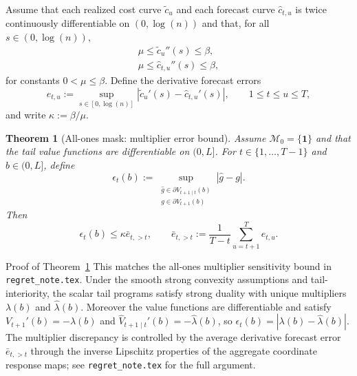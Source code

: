 \documentclass{uai2026} %
\newtheorem{theorem}{Theorem}[section]
\newcommand{\1}{\mathbf{1}}
\newcommand{\mcal}{\mathcal{M}}
\begin{document}
Assume that each realized cost curve $\tilde{c}_u$ and each forecast curve $\hat{c}_{t,u}$ is twice continuously differentiable on $(0,\log(n))$ and that, for all $s\in(0,\log(n))$,
\begin{equation*}
  \begin{aligned}
    \mu \le \tilde{c}_u''(s) \le \beta,\\
    \mu \le \hat{c}_{t,u}''(s) \le \beta,
  \end{aligned}
\end{equation*}
for constants $0<\mu\le \beta$.
Define the derivative forecast errors
\begin{equation}
  \label{eq:derivative-error}
  e_{t,u} := \sup_{s\in[0,\log(n)]}\left|\tilde{c}_u'(s) - \hat{c}_{t,u}'(s)\right|,
  \qquad 1 \le t \le u \le T,
\end{equation}
and write $\kappa:=\beta/\mu$.

\begin{theorem}[All-ones mask: multiplier error bound]
  \label{thm:epsilon-allones}
  Assume $\mcal_{0}=\{\1\}$ and that the tail value functions are differentiable on $(0,L]$.
  For $t\in\{1,\dots,T-1\}$ and $b\in(0,L]$, define
  \begin{equation*}
    \epsilon_t(b)
    :=
    \sup_{\substack{\hat{g}\in \partial \hat{V}_{t+1\mid t}(b)\\ g\in \partial V_{t+1}(b)}}
    |\hat{g}-g|.
  \end{equation*}
  Then
  \begin{equation*}
    \epsilon_t(b) \le \kappa \bar{e}_{t,>t},
    \qquad
    \bar{e}_{t,>t}:=\frac{1}{T-t}\sum_{u=t+1}^{T} e_{t,u}.
  \end{equation*}
\end{theorem}

\begin{appendixproof}{Proof of Theorem~\ref{thm:epsilon-allones}}
  This matches the all-ones multiplier sensitivity bound in \texttt{regret\_note.tex}.
  Under the smooth strong convexity assumptions and tail-interiority, the scalar tail programs satisfy strong duality with unique multipliers $\lambda(b)$ and $\hat{\lambda}(b)$.
  Moreover the value functions are differentiable and satisfy $V_{t+1}'(b)=-\lambda(b)$ and $\hat{V}_{t+1\mid t}'(b)=-\hat{\lambda}(b)$, so $\epsilon_t(b)=|\lambda(b)-\hat{\lambda}(b)|$.
  The multiplier discrepancy is controlled by the average derivative forecast error $\bar{e}_{t,>t}$ through the inverse Lipschitz properties of the aggregate coordinate response maps; see \texttt{regret\_note.tex} for the full argument.
\end{appendixproof}
\end{document}
